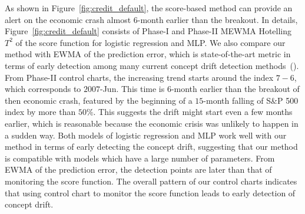 \documentclass[twoside,11pt]{article}
\begin{document}
As shown in Figure~\ref{fig:credit_default}, the score-based method can provide an alert on the economic crash almost $6$-month earlier than the breakout. In details, Figure~\ref{fig:credit_default} consists of Phase-I and Phase-II MEWMA Hotelling $T^2$ of the score function for logistic regression and MLP. We also compare our method with EWMA of the prediction error, which is state-of-the-art metric in terms of early detection among many current concept drift detection methods~(\cite{barros2018large}). From Phase-II control charts, the increasing trend starts around the index $7-6$, which corresponds to $2007$-Jun. This time is $6$-month earlier than the breakout of then economic crash, featured by the beginning of a $15$-month falling of S\&P 500 index by more than $50\%$. This suggests the drift might start even a few months earlier, which is reasonable because the economic crisis was unlikely to happen in a sudden way. Both models of logistic regression and MLP work well with our method in terms of early detecting the concept drift, suggesting that our method is compatible with models which have a large number of parameters. From EWMA of the prediction error, the detection points are later than that of monitoring the score function. The overall pattern of our control charts indicates that using control chart to monitor the score function leads to early detection of concept drift. 
\end{document}
